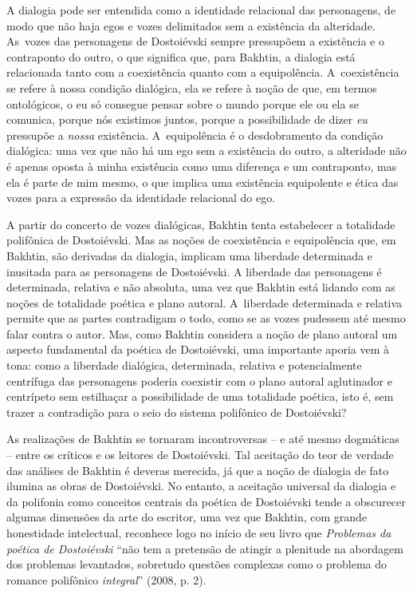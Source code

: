 {A dialogia pode ser entendida como a identidade relacional das
personagens, de modo que não haja egos e vozes delimitados sem a
existência da alteridade. As~vozes das personagens de Dostoiévski sempre
pressupõem a existência e o contraponto do outro, o que significa que,
para Bakhtin, a dialogia está relacionada tanto com a coexistência
quanto com a equipolência. A~coexistência se refere à nossa condição
dialógica, ela se refere à noção de que, em termos ontológicos, o eu só
consegue pensar sobre o mundo porque ele ou ela se comunica, porque nós
existimos juntos, porque a possibilidade de dizer \emph{eu} pressupõe a
\emph{nossa} existência. A~equipolência é o desdobramento da condição
dialógica: uma vez que não há um ego sem a existência do outro, a
alteridade não é apenas oposta à minha existência como uma diferença e
um contraponto, mas ela é parte de mim mesmo, o que implica uma
existência equipolente e ética das vozes para a expressão da identidade
relacional do ego.

A partir do concerto de vozes dialógicas, Bakhtin tenta estabelecer a
totalidade polifônica de Dostoiévski. Mas as noções de coexistência e
equipolência que, em Bakhtin, são derivadas da dialogia, implicam uma
liberdade determinada e inusitada para as personagens de Dostoiévski. A
liberdade das personagens é determinada, relativa e não absoluta, uma
vez que Bakhtin está lidando com as noções de totalidade poética e plano
autoral. A~liberdade determinada e relativa permite que as partes
contradigam o todo, como se as vozes pudessem até mesmo falar contra o
autor. Mas, como Bakhtin considera a noção de plano autoral um aspecto
fundamental da poética de Dostoiévski, uma importante aporia vem à tona:
como a liberdade dialógica, determinada, relativa e potencialmente
centrífuga das personagens poderia coexistir com o plano autoral
aglutinador e centrípeto sem estilhaçar a possibilidade de uma
totalidade poética, isto é, sem trazer a contradição para o seio do
sistema polifônico de Dostoiévski?

As realizações de Bakhtin se tornaram incontroversas -- e até mesmo
dogmáticas -- entre os críticos e os leitores de Dostoiévski. Tal
aceitação do teor de verdade das análises de Bakhtin é deveras merecida,
já que a noção de dialogia de fato ilumina as obras de Dostoiévski. No
entanto, a aceitação universal da dialogia e da polifonia como conceitos
centrais da poética de Dostoiévski tende a obscurecer algumas dimensões
da arte do escritor, uma vez que Bakhtin, com grande honestidade
intelectual, reconhece logo no início de seu livro que \emph{Problemas
da poética de Dostoiévski} ``não tem a pretensão de atingir a plenitude
na abordagem dos problemas levantados, sobretudo questões complexas como
o problema do romance polifônico \emph{integral}'' (2008, p. 2).

}
